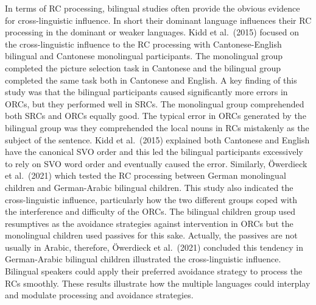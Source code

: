\documentclass[
]{article}
\begin{document}
In terms of RC processing, bilingual studies often provide the obvious
evidence for cross-linguistic influence. In short their dominant
language influences their RC processing in the dominant or weaker
languages. Kidd et al.~(2015) focused on the cross-linguistic influence
to the RC processing with Cantonese-English bilingual and Cantonese
monolingual participants. The monolingual group completed the picture
selection task in Cantonese and the bilingual group completed the same
task both in Cantonese and English. A key finding of this study was that
the bilingual participants caused significantly more errors in ORCs, but
they performed well in SRCs. The monolingual group comprehended both
SRCs and ORCs equally good. The typical error in ORCs generated by the
bilingual group was they comprehended the local nouns in RCs mistakenly
as the subject of the sentence. Kidd et al.~(2015) explained both
Cantonese and English have the canonical SVO order and this led the
bilingual participants excessively to rely on SVO word order and
eventually caused the error. Similarly, Öwerdieck et al.~(2021) which
tested the RC processing between German monolingual children and
German-Arabic bilingual children. This study also indicated the
cross-linguistic influence, particularly how the two different groups
coped with the interference and difficulty of the ORCs. The bilingual
children group used resumptives as the avoidance strategies against
intervention in ORCs but the monolingual children used passives for this
sake. Actually, the passives are not usually in Arabic, therefore,
Öwerdieck et al.~(2021) concluded this tendency in German-Arabic
bilingual children illustrated the cross-linguistic influence. Bilingual
speakers could apply their preferred avoidance strategy to process the
RCs smoothly. These results illustrate how the multiple languages could
interplay and modulate processing and avoidance strategies.
\end{document}
